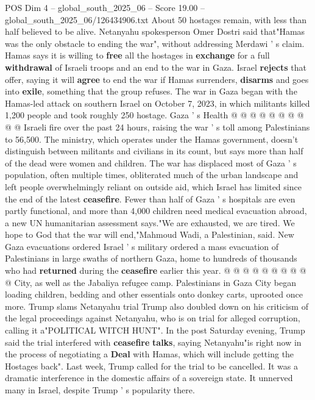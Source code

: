 \begin{textsample}{POS Dim 4 – global\_south\_2025\_06 – Score 19.00 – global\_south\_2025\_06/126434906.txt}
About 50 hostages remain, with less than half believed to be alive.
Netanyahu spokesperson Omer Dostri said that"Hamas was the only obstacle to ending the war", without addressing Merdawi ' s claim.
Hamas says it is willing to \textbf{free} all the hostages in \textbf{exchange} for a full \textbf{withdrawal} of Israeli troops and an end to the war in Gaza.
Israel \textbf{rejects} that offer, saying it will \textbf{agree} to end the war if Hamas surrenders, \textbf{disarms} and goes into \textbf{exile}, something that the group refuses.
The war in Gaza began with the Hamas-led attack on southern Israel on October 7, 2023, in which militants killed 1,200 people and took roughly 250 hostage.
Gaza ' s Health @ @ @ @ @ @ @ @ @ @ Israeli fire over the past 24 hours, raising the war ' s toll among Palestinians to 56,500.
The ministry, which operates under the Hamas government, doesn't distinguish between militants and civilians in its count, but says more than half of the dead were women and children.
The war has displaced most of Gaza ' s population, often multiple times, obliterated much of the urban landscape and left people overwhelmingly reliant on outside aid, which Israel has limited since the end of the latest \textbf{ceasefire}.
Fewer than half of Gaza ' s hospitals are even partly functional, and more than 4,000 children need medical evacuation abroad, a new UN humanitarian assessment says."We are exhausted, we are tired.
We hope to God that the war will end,"Mahmoud Wadi, a Palestinian, said.
New Gaza evacuations ordered Israel ' s military ordered a mass evacuation of Palestinians in large swaths of northern Gaza, home to hundreds of thousands who had \textbf{returned} during the \textbf{ceasefire} earlier this year. @ @ @ @ @ @ @ @ @ @ City, as well as the Jabaliya refugee camp.
Palestinians in Gaza City began loading children, bedding and other essentials onto donkey carts, uprooted once more.
Trump slams Netanyahu trial Trump also doubled down on his criticism of the legal proceedings against Netanyahu, who is on trial for alleged corruption, calling it a"POLITICAL WITCH HUNT".
In the post Saturday evening, Trump said the trial interfered with \textbf{ceasefire} \textbf{talks}, saying Netanyahu"is right now in the process of negotiating a \textbf{Deal} with Hamas, which will include getting the Hostages back".
Last week, Trump called for the trial to be cancelled.
It was a dramatic interference in the domestic affairs of a sovereign state.
It unnerved many in Israel, despite Trump ' s popularity there.

\end{textsample}
